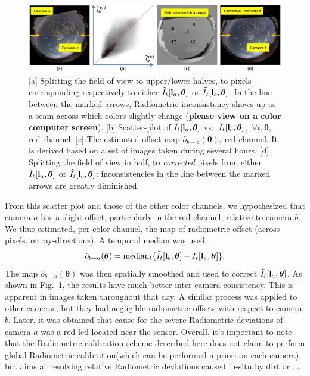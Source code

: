 \documentclass[runningheads]{llncs}
\begin{document}
\begin{figure}[t!]
\begin{center}
   \includegraphics[width=\linewidth]{figures/bias4.eps}
\end{center}
   \vspace{-0.6cm}
   \caption{[a] Splitting the field of view to upper/lower halves, to pixels corresponding
   respectively to either $\tilde I_t[{\bf l}_a,{\bm \theta}]$  or $\tilde I_t[{\bf l}_{b},{\bm \theta}]$. In the line between the marked arrows, Radiometric inconsistency shows-up as a seam across which colors slightly change ({\bf please view on a color computer screen}). [b] Scatter-plot of
   $\tilde I_t[{\bf l}_a,{\bm \theta}]$ vs.~$\tilde I_t[{\bf l}_{b},{\bm \theta}]$, $~\forall t,{\bm \theta}$, red-channel. [c] The estimated offset map ${\hat o}_{b-a}({\bm \theta})$, red channel. It is derived based on a set of images taken during several hours.
   [d] Splitting the field of view in half, to {\em corrected} pixels from either
   $\hat I_t[{\bf l}_a,{\bm \theta}]$  or $\hat I_t[{\bf l}_{b},{\bm \theta}]$: inconsistencies in the line between the marked arrows are greatly
   diminished.
   }
\label{fig:calibration}
\end{figure}
From this scatter plot and those of the other color channels, we hypothesized that camera $a$ has a slight offset, particularly in the red channel, relative to camera $b$. We thus estimated, per color channel, the map of radiometric offset (across pixels, or ray-directions). A temporal median was used.
\begin{equation}
 {\hat o}_{b-a}({\bm \theta})=
  {\rm median}_{t} \{\tilde I_t[{\bf l}_b,{\bm \theta}]-I_t[{\bf l}_a,{\bm \theta}]\}.
 \label{eq:hato}
\end{equation}
The map ${\hat o}_{b-a}({\bm \theta})$ was then spatially smoothed and used to correct $\tilde I_t[{\bf l}_a,{\bm \theta}]$. As shown in Fig.~\ref{fig:calibration}, the results have much better inter-camera consistency. This is apparent in images taken throughout that day. A similar process was applied to other cameras, but they had negligible radiometric offsets with respect to camera $b$. Later, it was obtained that cause for the severe Radiometric deviations of camera $a$ was a red led located near the sensor.
Overall, it's important to note that the Radiometric calibration scheme described here does not claim to perform global Radiometric calibration(which can be performed a-priori on each camera), but aims at resolving relative Radiometric deviations caused in-situ by dirt or ...
\end{document}
